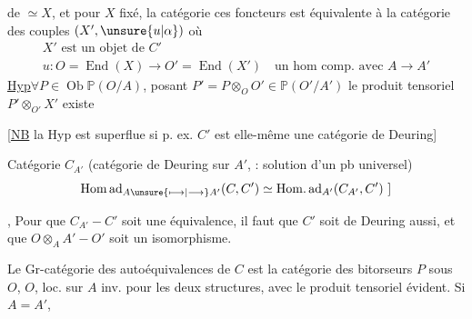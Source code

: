 
de  $\simeq X$, et pour $X$ fixé, la  catégorie  ces foncteurs est équivalente à la catégorie des couples $(X',\unsure{u|\alpha})$ où
\[
\begin{gathered}
X'\text{ est un objet de }C'\\
u:O=\operatorname{End}(X)\longrightarrow O'=\operatorname{End}(X')\quad\text{un hom comp. avec }A\to A'
\end{gathered}
\]
\uline{Hyp}\quad $\forall P\in\operatorname{Ob}\mathbb P(O/A)$,  posant $P'=P\otimes_O O'\in\mathbb P(O'/A')$ le produit tensoriel $P'\otimes_{O'}X'$ existe

[\uline{NB} la Hyp est superflue si p. ex. $C'$ est elle-même une catégorie de Deuring]

Catégorie $C_{A'}$ (catégorie de Deuring sur $A'$,  : solution d'un pb universel)
\[
\operatorname{Hom\,ad}_{A\unsure{\longmapsto|\longrightarrow}A'}(C,C')\simeq\operatorname{Hom.ad}_{A'}(C_{A'},C')\ ]
\]

, Pour que $C_{A'}\mathbin{-}C'$ soit une équivalence, il faut que $C'$ soit de Deuring aussi, et que $O\otimes_A A'\mathbin{-}O'$ soit un isomorphisme.

Le Gr-catégorie des autoéquivalences de $C$ est \inserted{$\simeq$} la catégorie des bitorseurs $P$ sous $O$, $O$, loc. sur $A$ inv. pour les deux structures, avec le produit tensoriel évident. Si $A=A'$,

